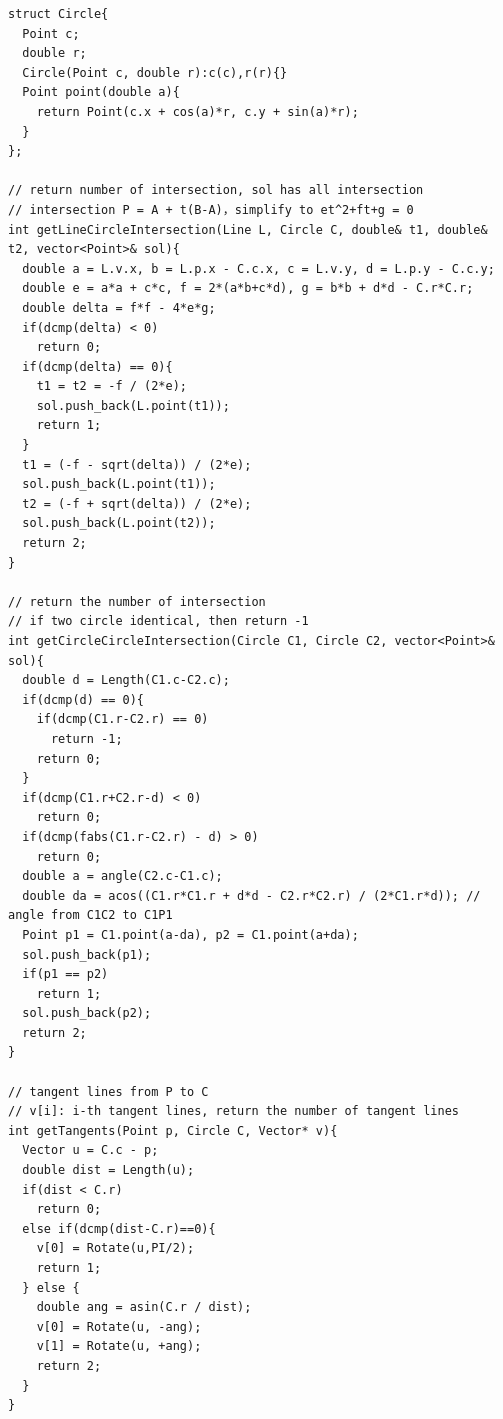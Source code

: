 \documentclass[10pt,landscape]{article}
\begin{document}
\begin{multicols}{2}
\begin{lstlisting}
struct Circle{
  Point c;
  double r;
  Circle(Point c, double r):c(c),r(r){}
  Point point(double a){
    return Point(c.x + cos(a)*r, c.y + sin(a)*r);
  }
};

// return number of intersection, sol has all intersection
// intersection P = A + t(B-A)，simplify to et^2+ft+g = 0
int getLineCircleIntersection(Line L, Circle C, double& t1, double& t2, vector<Point>& sol){
  double a = L.v.x, b = L.p.x - C.c.x, c = L.v.y, d = L.p.y - C.c.y;
  double e = a*a + c*c, f = 2*(a*b+c*d), g = b*b + d*d - C.r*C.r;
  double delta = f*f - 4*e*g;
  if(dcmp(delta) < 0)
    return 0;
  if(dcmp(delta) == 0){
    t1 = t2 = -f / (2*e);
    sol.push_back(L.point(t1));
    return 1;
  }
  t1 = (-f - sqrt(delta)) / (2*e);
  sol.push_back(L.point(t1));
  t2 = (-f + sqrt(delta)) / (2*e);
  sol.push_back(L.point(t2));
  return 2;
}

// return the number of intersection
// if two circle identical, then return -1
int getCircleCircleIntersection(Circle C1, Circle C2, vector<Point>& sol){
  double d = Length(C1.c-C2.c);
  if(dcmp(d) == 0){
    if(dcmp(C1.r-C2.r) == 0)
      return -1;
    return 0;
  }
  if(dcmp(C1.r+C2.r-d) < 0)
    return 0;
  if(dcmp(fabs(C1.r-C2.r) - d) > 0)
    return 0;
  double a = angle(C2.c-C1.c);
  double da = acos((C1.r*C1.r + d*d - C2.r*C2.r) / (2*C1.r*d)); // angle from C1C2 to C1P1
  Point p1 = C1.point(a-da), p2 = C1.point(a+da);
  sol.push_back(p1);
  if(p1 == p2)
    return 1;
  sol.push_back(p2);
  return 2;
}

// tangent lines from P to C
// v[i]: i-th tangent lines, return the number of tangent lines
int getTangents(Point p, Circle C, Vector* v){
  Vector u = C.c - p;
  double dist = Length(u);
  if(dist < C.r)
    return 0;
  else if(dcmp(dist-C.r)==0){
    v[0] = Rotate(u,PI/2);
    return 1;
  } else {
    double ang = asin(C.r / dist);
    v[0] = Rotate(u, -ang);
    v[1] = Rotate(u, +ang);
    return 2;
  }
}


\end{lstlisting}
\end{multicols}
\end{document}

